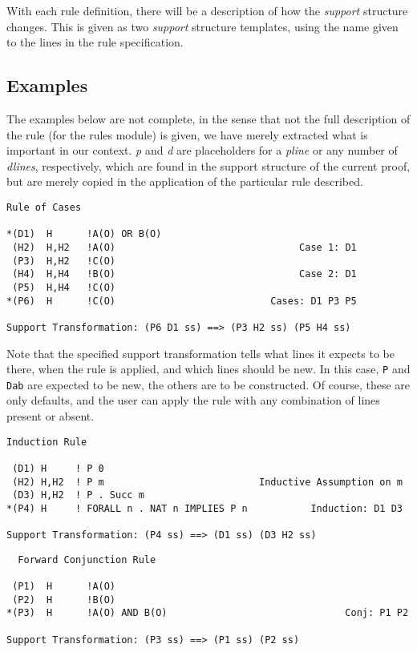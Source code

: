 With each rule definition, there will be a description of how the {\it support}
structure changes.  This is given as two {\it support} structure templates,
using the name given to the lines in the rule specification.

\subsection{Examples}

The examples below are not complete, in the sense that not the full
description of the rule (for the rules module) is given, we have merely
extracted what is important in our context.  {\it p} and {\it d} are
placeholders for a {\it pline} or any number of {\it dlines}, respectively,
which are found in the support structure of the current proof, but are
merely copied in the application of the particular rule described.

\begin{verbatim}
Rule of Cases

*(D1)  H      !A(O) OR B(O)                                          
 (H2)  H,H2   !A(O)                                Case 1: D1
 (P3)  H,H2   !C(O)                                          
 (H4)  H,H4   !B(O)                                Case 2: D1
 (P5)  H,H4   !C(O)                                          
*(P6)  H      !C(O)                           Cases: D1 P3 P5

Support Transformation: (P6 D1 ss) ==> (P3 H2 ss) (P5 H4 ss) 
\end{verbatim}

Note that the specified support transformation tells \TPS what lines
it expects to be there, when the rule is applied, and which lines
should be new.  In this case, {\tt P} and {\tt Dab} are expected to be new,
the others are to be constructed.  Of course, these are only defaults,
and the user can apply the rule with any combination of lines present or
absent.


\begin{verbatim}
Induction Rule

 (D1) H     ! P 0
 (H2) H,H2  ! P m                           Inductive Assumption on m
 (D3) H,H2  ! P . Succ m
*(P4) H     ! FORALL n . NAT n IMPLIES P n           Induction: D1 D3

Support Transformation: (P4 ss) ==> (D1 ss) (D3 H2 ss)
\end{verbatim}

\begin{verbatim}
  Forward Conjunction Rule

 (P1)  H      !A(O)                                          
 (P2)  H      !B(O)                                          
*(P3)  H      !A(O) AND B(O)                               Conj: P1 P2

Support Transformation: (P3 ss) ==> (P1 ss) (P2 ss) 
\end{verbatim}


